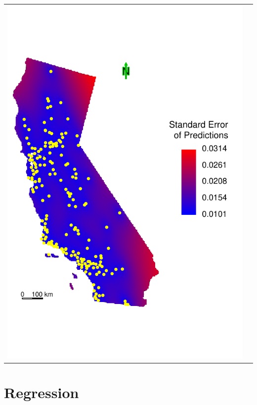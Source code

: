 \documentclass[mathserif,compress]{beamer}\usepackage{graphicx, color}
\makeatletter
\def\maxwidth{ %
  \ifdim\Gin@nat@width>\linewidth
    \linewidth
  \else
    \Gin@nat@width
  \fi
}
\makeatother
\begin{document}
\begin{frame}[fragile]
\begin{tabular} {p{4.5cm} p{4.5cm}}
		\vspace{-.8cm}
		{\centering \includegraphics[width=.9\maxwidth]{figure/CA-predSEMap} }

	\end{tabular}

\end{frame}

\section{Regression}
\end{document}
